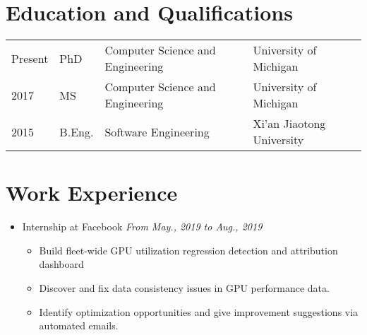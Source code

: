 \documentclass[letterpaper,11pt]{article}
\begin{document}
\maketitle

\section{Education and Qualifications}

\begin{tabular}{llll}
    Present        & PhD  & Computer Science and Engineering & University of Michigan \\
    2017           & MS   & Computer Science and Engineering & University of Michigan \\
    2015           & B.Eng. & Software Engineering & Xi'an Jiaotong University
\end{tabular}

\begin{publications}
\end{publications}

\section{Work Experience}
\begin{itemize}
    \item Internship at Facebook \hfill \textit{From May., 2019 to Aug., 2019}
    \begin{itemize}
        \item Build fleet-wide GPU utilization regression detection and attribution dashboard
        \item Discover and fix data consistency issues in GPU performance data.
        \item Identify optimization opportunities and give improvement suggestions via automated 
emails.
    \end{itemize}

\end{itemize}
\end{document}
